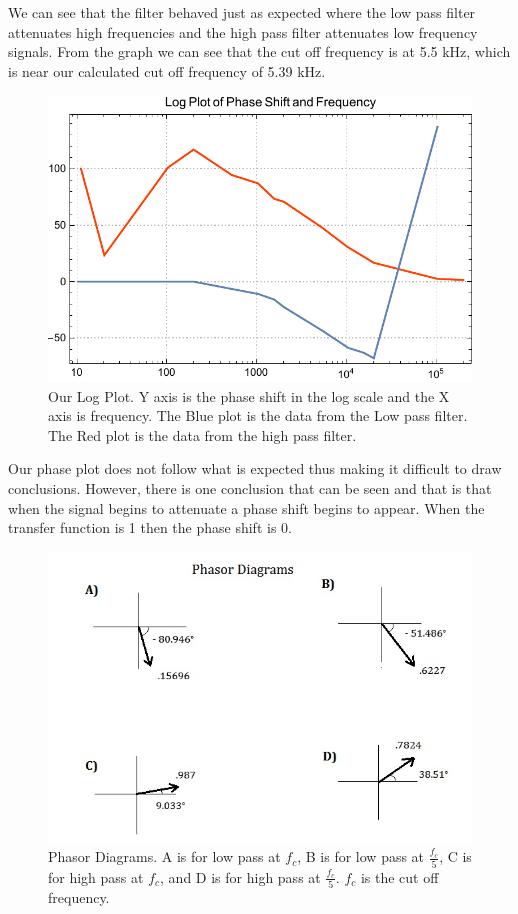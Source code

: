 \documentclass[11pt,letterpaper,onecolumn]{article}
\begin{document}
We can see that the filter behaved just as expected where the low pass filter attenuates high frequencies and the high pass filter attenuates low frequency signals. From the graph we can see that the cut off frequency is at 5.5 kHz, which is near our calculated cut off frequency of 5.39 kHz.

\begin{figure}[H]
    \centering
    \includegraphics[scale = .8]{PhaseShift.pdf}
    \caption{Our Log Plot. Y axis is the phase shift in the log scale and the X axis is frequency. The Blue plot is the data from the Low pass filter. The Red plot is the data from the high pass filter.}
    \label{fig:log}
\end{figure}

Our phase plot does not follow what is expected thus making it difficult to draw conclusions. However, there is one conclusion that can be seen and that is that when the signal begins to attenuate a phase shift begins to appear. When the transfer function is 1 then the phase shift is 0.

\begin{figure} [H]
    \centering
    \includegraphics[scale = .8]{PhasorDiagram.jpg}
    \caption{Phasor Diagrams. A is for low pass at $f_c$, B is for low pass at $\frac{f_c}{5}$, C is for high pass at $f_c$, and D is for high pass at $\frac{f_c}{5}$. $f_c$ is the cut off frequency. }
    \label{fig:phasor}
\end{figure}
\end{document}
